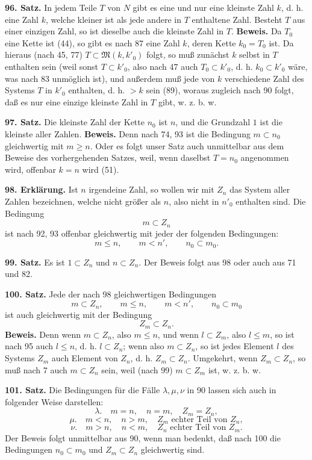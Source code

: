 \documentclass[11pt]{article}
\newcommand{\Mf}{\mathfrak{M}}
\newcommand{\partof}{\mathrel{\subset}}
\begin{document}
\noindent\textbf{96. Satz.} In jedem Teile $T$ von $N$ gibt es eine und nur eine kleinste Zahl $k$, d. h. eine Zahl $k$, welche kleiner ist als jede andere in $T$ enthaltene Zahl. Besteht $T$ aus einer einzigen Zahl, so ist dieselbe auch die kleinste Zahl in $T$. \textbf{Beweis.} Da $T_0$ eine Kette ist (44), so gibt es nach 87 eine Zahl $k$, deren Kette $k_0=T_0$ ist. Da hieraus (nach 45, 77) $T\partof\Mf(k,k'_0)$ folgt, so muß zunächst $k$ selbst in $T$ enthalten sein (weil sonst $T\partof k'_0$, also nach 47 auch $T_0\partof k'_0$, d. h. $k_0\partof k'_0$ wäre, was nach 83 unmöglich ist), und außerdem muß jede von $k$ verschiedene Zahl des Systems $T$ in $k'_0$ enthalten, d. h. $>k$ sein (89), woraus zugleich nach 90 folgt, daß es nur eine einzige kleinste Zahl in $T$ gibt, w. z. b. w.

\noindent\textbf{97. Satz.} Die kleinste Zahl der Kette $n_0$ ist $n$, und die Grundzahl $1$ ist die kleinste aller Zahlen. \textbf{Beweis.} Denn nach 74, 93 ist die Bedingung $m\partof n_0$ gleichwertig mit $m\ge n$. Oder es folgt unser Satz auch unmittelbar aus dem Beweise des vorhergehenden Satzes, weil, wenn daselbst $T=n_0$ angenommen wird, offenbar $k=n$ wird (51).

\noindent\textbf{98. Erklärung.} Ist $n$ irgendeine Zahl, so wollen wir mit $Z_n$ das System aller Zahlen bezeichnen, welche nicht größer als $n$, also nicht in $n'_0$ enthalten sind. Die Bedingung
\[
m\partof Z_n
\]
ist nach 92, 93 offenbar gleichwertig mit jeder der folgenden Bedingungen:
\[
m\le n,\qquad m<n',\qquad n_0\partof m_0.
\]

\noindent\textbf{99. Satz.} Es ist $1\partof Z_n$ und $n\partof Z_n$. Der Beweis folgt aus 98 oder auch aus 71 und 82.

\noindent\textbf{100. Satz.} Jede der nach 98 gleichwertigen Bedingungen
\[
m\partof Z_n,\qquad m\le n,\qquad m<n',\qquad n_0\partof m_0
\]
ist auch gleichwertig mit der Bedingung
\[
Z_m\partof Z_n.
\]
\textbf{Beweis.} Denn wenn $m\partof Z_n$, also $m\le n$, und wenn $l\partof Z_m$, also $l\le m$, so ist nach 95 auch $l\le n$, d. h. $l\partof Z_n$; wenn also $m\partof Z_n$, so ist jedes Element $l$ des Systems $Z_m$ auch Element von $Z_n$, d. h. $Z_m\partof Z_n$. Umgekehrt, wenn $Z_m\partof Z_n$, so muß nach 7 auch $m\partof Z_n$ sein, weil (nach 99) $m\partof Z_m$ ist, w. z. b. w.

\noindent\textbf{101. Satz.} Die Bedingungen für die Fälle $\lambda,\mu,\nu$ in 90 lassen sich auch in folgender Weise darstellen:
\[
\lambda.\quad m=n,\quad n=m,\quad Z_m=Z_n,
\]
\[
\mu.\quad m<n,\quad n>m,\quad Z_m\text{ echter Teil von }Z_n,
\]
\[
\nu.\quad m>n,\quad n<m,\quad Z_n\text{ echter Teil von }Z_m.
\]
Der Beweis folgt unmittelbar aus 90, wenn man bedenkt, daß nach 100 die Bedingungen $n_0\partof m_0$ und $Z_m\partof Z_n$ gleichwertig sind.
\end{document}
